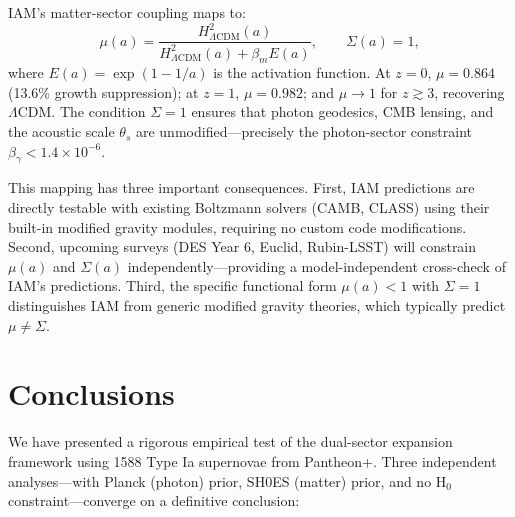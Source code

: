 \documentclass[twocolumn,superscriptaddress,prd,amsmath,amssymb]{revtex4-2}
\begin{document}
IAM's matter-sector coupling maps to:
\begin{equation}
\mu(a) = \frac{H^2_{\Lambda\text{CDM}}(a)}{H^2_{\Lambda\text{CDM}}(a) + \beta_m E(a)}, \qquad \Sigma(a) = 1,
\end{equation}
where $E(a) = \exp(1 - 1/a)$ is the activation function. At $z = 0$, $\mu = 0.864$ (13.6\% growth suppression); at $z = 1$, $\mu = 0.982$; and $\mu \to 1$ for $z \gtrsim 3$, recovering $\Lambda$CDM. The condition $\Sigma = 1$ ensures that photon geodesics, CMB lensing, and the acoustic scale $\theta_s$ are unmodified—precisely the photon-sector constraint $\beta_\gamma < 1.4 \times 10^{-6}$.

This mapping has three important consequences. First, IAM predictions are directly testable with existing Boltzmann solvers (CAMB, CLASS) using their built-in modified gravity modules, requiring no custom code modifications. Second, upcoming surveys (DES Year 6, Euclid, Rubin-LSST) will constrain $\mu(a)$ and $\Sigma(a)$ independently—providing a model-independent cross-check of IAM's predictions. Third, the specific functional form $\mu(a) < 1$ with $\Sigma = 1$ distinguishes IAM from generic modified gravity theories, which typically predict $\mu \neq \Sigma$.

\section{Conclusions}

We have presented a rigorous empirical test of the dual-sector expansion framework using 1588 Type Ia supernovae from Pantheon+. Three independent analyses—with Planck (photon) prior, SH0ES (matter) prior, and no H$_0$ constraint—converge on a definitive conclusion:
\end{document}
